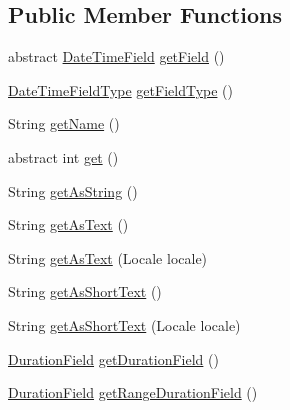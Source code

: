\subsection*{Public Member Functions}
\begin{DoxyCompactItemize}
\item 
abstract \hyperlink{classorg_1_1joda_1_1time_1_1_date_time_field}{Date\-Time\-Field} \hyperlink{classorg_1_1joda_1_1time_1_1field_1_1_abstract_partial_field_property_a2164a7a0f3bd519b54e0c4801e5dbe49}{get\-Field} ()
\item 
\hyperlink{classorg_1_1joda_1_1time_1_1_date_time_field_type}{Date\-Time\-Field\-Type} \hyperlink{classorg_1_1joda_1_1time_1_1field_1_1_abstract_partial_field_property_ade4c417e489ba2edbc32e447e2d1d7a0}{get\-Field\-Type} ()
\item 
String \hyperlink{classorg_1_1joda_1_1time_1_1field_1_1_abstract_partial_field_property_a1e26cc5d4ab1896454a1c435dd7fe200}{get\-Name} ()
\item 
abstract int \hyperlink{classorg_1_1joda_1_1time_1_1field_1_1_abstract_partial_field_property_ab9e0e8a80b5944c885aa01d5e516b0a5}{get} ()
\item 
String \hyperlink{classorg_1_1joda_1_1time_1_1field_1_1_abstract_partial_field_property_a3533a7d3926943570ca3b50e43c3c13c}{get\-As\-String} ()
\item 
String \hyperlink{classorg_1_1joda_1_1time_1_1field_1_1_abstract_partial_field_property_a9dadd9ada49354abd6d0ffef88ef1bae}{get\-As\-Text} ()
\item 
String \hyperlink{classorg_1_1joda_1_1time_1_1field_1_1_abstract_partial_field_property_a3bb650dc43a6abca1e02fe1739d1a72d}{get\-As\-Text} (Locale locale)
\item 
String \hyperlink{classorg_1_1joda_1_1time_1_1field_1_1_abstract_partial_field_property_a83251abe1059bbf74e18f4f15a824f86}{get\-As\-Short\-Text} ()
\item 
String \hyperlink{classorg_1_1joda_1_1time_1_1field_1_1_abstract_partial_field_property_a36dbd179591c7c12aa2624a8d1193339}{get\-As\-Short\-Text} (Locale locale)
\item 
\hyperlink{classorg_1_1joda_1_1time_1_1_duration_field}{Duration\-Field} \hyperlink{classorg_1_1joda_1_1time_1_1field_1_1_abstract_partial_field_property_a331eeb9c96e366b204c8f143c799fd63}{get\-Duration\-Field} ()
\item 
\hyperlink{classorg_1_1joda_1_1time_1_1_duration_field}{Duration\-Field} \hyperlink{classorg_1_1joda_1_1time_1_1field_1_1_abstract_partial_field_property_a2d46b66bb7f7cda493cf91d06ec7501d}{get\-Range\-Duration\-Field} ()

\end{DoxyCompactItemize}
